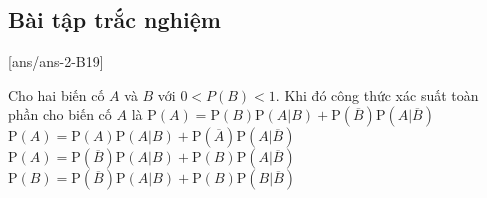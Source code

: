 ﻿\subsection{Bài tập trắc nghiệm}
{}[ans/ans-2-B19]
\begin{ex}%
Cho hai biến cố $A$ và $B$ với $0<P(B)<1$. Khi đó công thức xác suất toàn phần cho biến cố $A$ là
	\choice
	{\True $\mathrm{P}(A)=\mathrm{P}(B)\mathrm{P}(A|B)+\mathrm{P}(\overline{B})\mathrm{P}(A|\overline{B})$}
	{$\mathrm{P}(A)=\mathrm{P}(A)\mathrm{P}(A|B)+\mathrm{P}(\overline{A})\mathrm{P}(A|\overline{B})$}
	{$\mathrm{P}(A)=\mathrm{P}(\overline{B})\mathrm{P}(A|B)+\mathrm{P}(B)\mathrm{P}(A|\overline{B})$}
	{$\mathrm{P}(B)=\mathrm{P}(\overline{B})\mathrm{P}(A|B)+\mathrm{P}(B)\mathrm{P}(B|\overline{B})$}
\end{ex}


